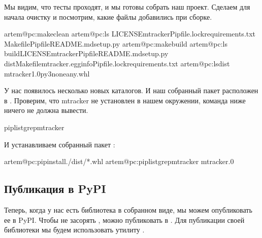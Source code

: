 \documentclass[letterpaper,10pt,russian]{sphinxmanual}
\begin{document}
\sphinxAtStartPar
Мы видим, что тесты проходят, и мы готовы собрать наш проект. Сделаем для начала очистку и посмотрим, какие файлы добавились при сборке.

\begin{sphinxVerbatim}[commandchars=\\\{\}]
artem@pc:\PYGZti{}\PYGZdl{}makeclean
artem@pc:\PYGZti{}\PYGZdl{}ls
LICENSEmtrackerPipfile.lockrequirements.txt
MakefilePipfileREADME.mdsetup.py
artem@pc:\PYGZti{}\PYGZdl{}makebuild
artem@pc:\PYGZti{}\PYGZdl{}ls
buildLICENSEmtrackerPipfileREADME.mdsetup.py
distMakefilemtracker.egg\PYGZhy{}infoPipfile.lockrequirements.txt
artem@pc:\PYGZti{}\PYGZdl{}lsdist
mtracker\PYGZhy{}1.0\PYGZhy{}py3\PYGZhy{}none\PYGZhy{}any.whl
\end{sphinxVerbatim}

\sphinxAtStartPar
У нас появилось несколько новых каталогов. И наш собранный пакет расположен в . Проверим, что mtracker не установлен в нашем окружении, команда ниже ничего не должна вывести.

\begin{sphinxVerbatim}[commandchars=\\\{\}]
piplistgrepmtracker
\end{sphinxVerbatim}

\sphinxAtStartPar
И устанавливаем собранный пакет :

\begin{sphinxVerbatim}[commandchars=\\\{\}]
artem@pc:\PYGZti{}\PYGZdl{}pipinstall./dist/*.whl
artem@pc:\PYGZti{}\PYGZdl{}piplistgrepmtracker
mtracker.0
\end{sphinxVerbatim}


\subsection{Публикация в PyPI}
\label{\detokenize{educational_materials/packaging/content:pypi}}
\sphinxAtStartPar
Теперь, когда у нас есть библиотека в собранном виде, мы можем опубликовать ее в PyPI. Чтобы не засорять , можно публиковать в . Для публикации своей библиотеки мы будем использовать утилиту .
\end{document}
